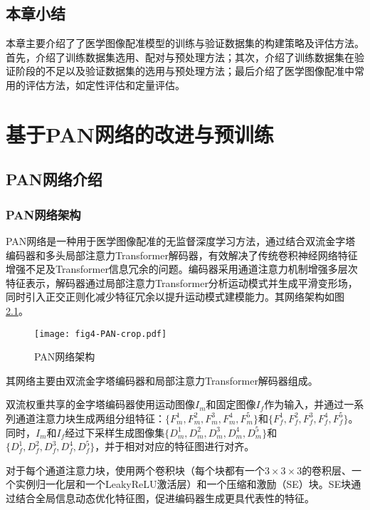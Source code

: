 \section{本章小结}

本章主要介绍了了医学图像配准模型的训练与验证数据集的构建策略及评估方法。首先，介绍了训练数据集选用、配对与预处理方法；其次，介绍了训练数据集在验证阶段的不足以及验证数据集的选用与预处理方法；最后介绍了医学图像配准中常用的评估方法，如定性评估和定量评估。

\chapter{基于PAN网络的改进与预训练}

\section{PAN网络介绍}

\subsection{PAN网络架构}

PAN网络是一种用于医学图像配准的无监督深度学习方法，通过结合双流金字塔编码器和多头局部注意力Transformer解码器，有效解决了传统卷积神经网络特征增强不足及Transformer信息冗余的问题。编码器采用通道注意力机制增强多层次特征表示，解码器通过局部注意力Transformer分析运动模式并生成平滑变形场，同时引入正交正则化减少特征冗余以提升运动模式建模能力。其网络架构如图\ref{fig:4}。

\begin{figure}[h]
    \centering
    \texttt{[image: fig4-PAN-crop.pdf]}
    \caption{PAN网络架构}
    \label{fig:4}
\end{figure}

其网络主要由双流金字塔编码器和局部注意力Transformer解码器组成。

双流权重共享的金字塔编码器使用运动图像$I_m$和固定图像$I_f$作为输入，并通过一系列通道注意力块生成两组分组特征：$\{F_m^1,F_m^2,F_m^3,F_m^4,F_m^5\}$和$\{F_f^1,F_f^2,F_f^3,F_f^4,F_f^5\}$。同时，$I_m$和$I_f$经过下采样生成图像集$\{D_m^1,D_m^2,D_m^3,D_m^4,D_m^5\}$和$\{D_f^1,D_f^2,D_f^3,D_f^4,D_f^5\}$，并于相对对应的特征图进行对齐。

对于每个通道注意力块，使用两个卷积块（每个块都有一个$3\times3\times 3$的卷积层、一个实例归一化层\cite{ulyanov2016instance}和一个LeakyReLU激活层）和一个压缩和激励（SE）块\cite{hu2018squeeze}。SE块通过结合全局信息动态优化特征图，促进编码器生成更具代表性的特征。


